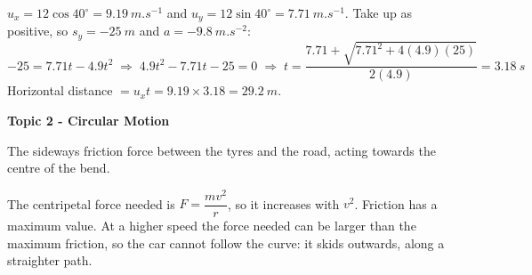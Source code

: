 \documentclass[12pt]{article}
\newcommand\anstopic[1]{\par\Needspace{8\baselineskip}\vspace{4mm}%
  \begin{center}{\headfont\bfseries\fontsize{14}{18}\selectfont #1\par}\end{center}\vspace{2pt}}
\begin{document}
\ansq
\begin{crit}
\end{crit}
\sample
$u_x = 12\cos 40^\circ = \qty{9.19}{m.s^{-1}}$ and $u_y = 12\sin 40^\circ = \qty{7.71}{m.s^{-1}}$.
Take up as positive, so $s_y = \qty{-25}{m}$ and $a = \qty{-9.8}{m.s^{-2}}$:
\[ -25 = 7.71t - 4.9t^2 \;\Rightarrow\; 4.9t^2 - 7.71t - 25 = 0 \;\Rightarrow\;
   t = \frac{7.71 + \sqrt{7.71^2 + 4(4.9)(25)}}{2(4.9)} = \qty{3.18}{s} \]
Horizontal distance $= u_x t = 9.19 \times 3.18 = \qty{29.2}{m}$.

\anstopic{Topic 2 - Circular Motion}

\ansq
{}
\begin{crit}
\end{crit}
\sample
The sideways friction force between the tyres and the road, acting towards the centre of the bend.
\begin{crit}
\end{crit}
\sample
The centripetal force needed is $F = \dfrac{mv^2}{r}$, so it increases with $v^2$. Friction has a
maximum value. At a higher speed the force needed can be larger than the maximum friction, so the
car cannot follow the curve: it skids outwards, along a straighter path.
\end{document}

